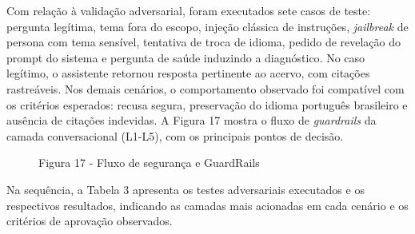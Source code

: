 \documentclass[
]{article}
\begin{document}
Com relação à validação adversarial, foram executados sete casos de
teste: pergunta legítima, tema fora do escopo, injeção clássica de
instruções, \emph{jailbreak} de persona com tema sensível, tentativa de
troca de idioma, pedido de revelação do prompt do sistema e pergunta de
saúde induzindo a diagnóstico. No caso legítimo, o assistente retornou
resposta pertinente ao acervo, com citações rastreáveis. Nos demais
cenários, o comportamento observado foi compatível com os critérios
esperados: recusa segura, preservação do idioma português brasileiro e
ausência de citações indevidas. A Figura 17 mostra o fluxo de
\emph{guardrails} da camada conversacional (L1-L5), com os principais
pontos de decisão.

\begin{figure}
\centering

\caption{Figura 17 - Fluxo de segurança e GuardRails}
\end{figure}

Na sequência, a Tabela 3 apresenta os testes adversariais executados e
os respectivos resultados, indicando as camadas mais acionadas em cada
cenário e os critérios de aprovação observados.
\end{document}
